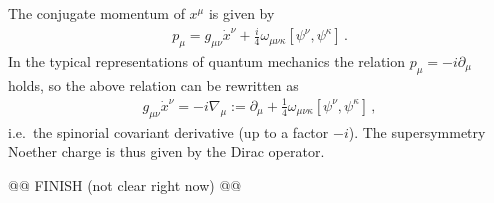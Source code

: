     The conjugate momentum of $x^\mu$ is given by
    \begin{gather}
        p_\mu = g_{\mu\nu}\dot{x}^\nu + \frac{i}{4}\omega_{\mu\nu\kappa}[\psi^\nu,\psi^\kappa]\,.
    \end{gather}
    In the typical representations of quantum mechanics the relation $p_\mu = -i\partial_\mu$ holds, so the above relation can be rewritten as
    \begin{gather}
        g_{\mu\nu}\dot{x}^\nu = -i\nabla_\mu := \partial_\mu + \frac{1}{4}\omega_{\mu\nu\kappa}[\psi^\nu,\psi^\kappa]\,,
    \end{gather}
    i.e.~the spinorial covariant derivative (up to a factor $-i$). The supersymmetry Noether charge is thus given by the Dirac operator.

    @@ FINISH (not clear right now)  @@